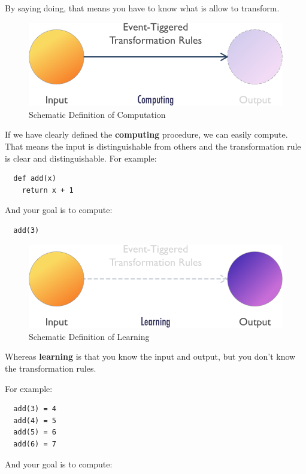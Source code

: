 By saying doing, that means you have to know what is allow to transform.

\begin{figure}
  \includegraphics[width=\linewidth]{img/computing.png}
  \caption{Schematic Definition of Computation}
  \label{fig:computation}
\end{figure}

If we have clearly defined the \textbf{computing} procedure, we can easily compute. That means the input is distinguishable from others and the transformation rule is clear and distinguishable.
For example:
\begin{verbatim}
  def add(x)
    return x + 1
\end{verbatim}

And your goal is to compute:

\begin{verbatim}
  add(3)
\end{verbatim}

\begin{figure}
  \includegraphics[width=\linewidth]{img/learning.png}
  \caption{Schematic Definition of Learning}
  \label{fig:learning}
\end{figure}

Whereas \textbf{learning} is that you know the input and output, but you don't know the transformation rules.

For example:
\begin{verbatim}
  add(3) = 4
  add(4) = 5
  add(5) = 6
  add(6) = 7
\end{verbatim}

And your goal is to compute:

